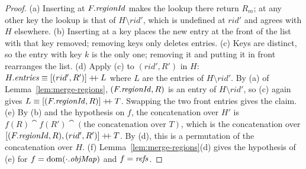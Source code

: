 \begin{proof}
(a) Inserting at $F.\mathit{regionId}$ makes the lookup there return $R_m$; at any other key the lookup is that of
$H \setminus rid'$, which is undefined at $rid'$ and agrees with $H$ elsewhere.
(b) Inserting at a key places the new entry at the front of the list with that key removed; removing
keys only deletes entries.
(c) Keys are distinct, so the entry with key $k$ is the only one; removing it and putting it in front
rearranges the list.
(d) Apply (c) to $(rid', R')$ in $H$: $H.\mathit{entries} \equiv [(rid', R')] \mathbin{+\!\!+} L$ where $L$ are the
entries of $H \setminus rid'$. By (a) of Lemma~\ref{lem:merge-regions}, $(F.\mathit{regionId}, R)$ is an entry of
$H \setminus rid'$, so (c) again gives $L \equiv [(F.\mathit{regionId}, R)] \mathbin{+\!\!+} T$. Swapping the two front entries
gives the claim.
(e) By (b) and the hypothesis on $f$, the concatenation over $H'$ is
$f(R) \cat f(R') \cat (\text{the concatenation over } T)$, which is the concatenation over
$[(F.\mathit{regionId}, R), (rid', R')] \mathbin{+\!\!+} T$. By (d), this is a permutation of the concatenation over $H$.
(f) Lemma~\ref{lem:merge-regions}(d) gives the hypothesis of (e) for $f = \mathrm{dom}(\cdot.\mathit{objMap})$ and
$f = \mathit{refs}$.
\end{proof}

